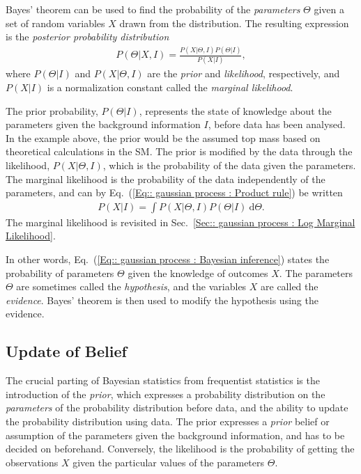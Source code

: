 \documentclass[twoside,english]{uiofysmaster}
\begin{document}
{{Bayes' theorem can be used to find the probability of the \textit{parameters} $\Theta$ given a set of random variables  $X$ drawn from the distribution. The resulting expression is the \textit{posterior probability distribution}
\begin{align}\label{Eq:: gaussian process : Bayesian inference}
P(\Theta | X , I) = \frac{P(X|\Theta, I) P(\Theta| I)}{P(X | I)},
\end{align}
where $P(\Theta | I)$  and $P(X |\Theta, I)$ are the \textit{prior} and \textit{likelihood}, respectively, and $P(X|I)$ is a normalization constant called the \textit{marginal likelihood}. 

The prior probability, $P(\Theta | I)$, represents the state of knowledge about the parameters given the background information $I$, before data has been analysed. In the example above, the prior would be the assumed top mass based on theoretical calculations in the SM. The prior is modified by the data through the likelihood, $P(X |\Theta, I)$, which is the probability of the data given the parameters.  The marginal likelihood is the probability of the data independently of the parameters, and can by Eq.~(\ref{Eq:: gaussian process : Product rule}) be written
\begin{align}
P(X|I) = \int P(X| \Theta, I) P(\Theta | I)~ \text{d} \Theta.
\end{align}
The marginal likelihood is revisited in Sec.~\ref{Sec:: gaussian process : Log Marginal Likelihood}.

In other words, Eq.~(\ref{Eq:: gaussian process : Bayesian inference}) states the probability of parameters $\Theta$ given the knowledge of outcomes $X$. The parameters $\Theta$ are sometimes called the \textit{hypothesis}, and the variables $X$ are called the \textit{evidence}. Bayes' theorem is then used to modify the hypothesis using the evidence. 



\subsection{Update of Belief}\label{Sec:: gaussian process : Priors and Likelihood}

The crucial parting of Bayesian statistics from frequentist statistics is the introduction of the \textit{prior}, which expresses a probability distribution on the \textit{parameters} of the probability distribution before data, and the ability to update the probability distribution using data. The prior expresses a \textit{prior} belief or assumption of the parameters given the background information, and has to be decided on beforehand. Conversely, the likelihood is the probability of getting the observations $X$ given the particular values of the parameters $\Theta$. 

}}
\end{document}
